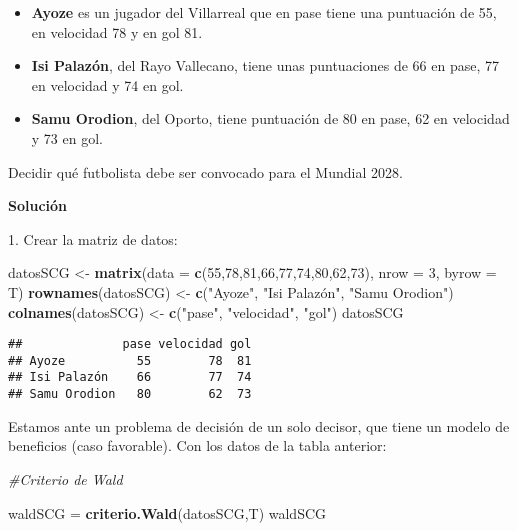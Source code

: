 \documentclass[
]{article}
\newenvironment{Shaded}{\begin{snugshade}}{\end{snugshade}}
\newcommand{\AttributeTok}[1]{\textcolor[rgb]{0.13,0.29,0.53}{#1}}
\newcommand{\CommentTok}[1]{\textcolor[rgb]{0.56,0.35,0.01}{\textit{#1}}}
\newcommand{\DecValTok}[1]{\textcolor[rgb]{0.00,0.00,0.81}{#1}}
\newcommand{\FunctionTok}[1]{\textcolor[rgb]{0.13,0.29,0.53}{\textbf{#1}}}
\newcommand{\NormalTok}[1]{#1}
\newcommand{\OtherTok}[1]{\textcolor[rgb]{0.56,0.35,0.01}{#1}}
\newcommand{\StringTok}[1]{\textcolor[rgb]{0.31,0.60,0.02}{#1}}
\begin{document}
\begin{itemize}
\item
  \textbf{Ayoze} es un jugador del Villarreal que en pase tiene una
  puntuación de 55, en velocidad 78 y en gol 81.
\item
  \textbf{Isi Palazón}, del Rayo Vallecano, tiene unas puntuaciones de
  66 en pase, 77 en velocidad y 74 en gol.
\item
  \textbf{Samu Orodion}, del Oporto, tiene puntuación de 80 en pase, 62
  en velocidad y 73 en gol.
\end{itemize}

Decidir qué futbolista debe ser convocado para el Mundial 2028.

\textbf{Solución}

1. Crear la matriz de datos:

\begin{Shaded}
\begin{Highlighting}[]
\NormalTok{datosSCG }\OtherTok{\textless{}{-}} \FunctionTok{matrix}\NormalTok{(}\AttributeTok{data =} \FunctionTok{c}\NormalTok{(}\DecValTok{55}\NormalTok{,}\DecValTok{78}\NormalTok{,}\DecValTok{81}\NormalTok{,}\DecValTok{66}\NormalTok{,}\DecValTok{77}\NormalTok{,}\DecValTok{74}\NormalTok{,}\DecValTok{80}\NormalTok{,}\DecValTok{62}\NormalTok{,}\DecValTok{73}\NormalTok{), }\AttributeTok{nrow =} \DecValTok{3}\NormalTok{, }\AttributeTok{byrow =}\NormalTok{ T)}
\FunctionTok{rownames}\NormalTok{(datosSCG) }\OtherTok{\textless{}{-}} \FunctionTok{c}\NormalTok{(}\StringTok{"Ayoze"}\NormalTok{, }\StringTok{"Isi Palazón"}\NormalTok{, }\StringTok{"Samu Orodion"}\NormalTok{)}
\FunctionTok{colnames}\NormalTok{(datosSCG) }\OtherTok{\textless{}{-}} \FunctionTok{c}\NormalTok{(}\StringTok{"pase"}\NormalTok{, }\StringTok{"velocidad"}\NormalTok{, }\StringTok{"gol"}\NormalTok{)}
\NormalTok{datosSCG}
\end{Highlighting}
\end{Shaded}

\begin{verbatim}
##              pase velocidad gol
## Ayoze          55        78  81
## Isi Palazón    66        77  74
## Samu Orodion   80        62  73
\end{verbatim}

Estamos ante un problema de decisión de un solo decisor, que tiene un
modelo de beneficios (caso favorable). Con los datos de la tabla
anterior:

\begin{Shaded}
\begin{Highlighting}[]
\CommentTok{\#Criterio de Wald}

\NormalTok{waldSCG }\OtherTok{=} \FunctionTok{criterio.Wald}\NormalTok{(datosSCG,T)}
\NormalTok{waldSCG}
\end{Highlighting}
\end{Shaded}
\end{document}
